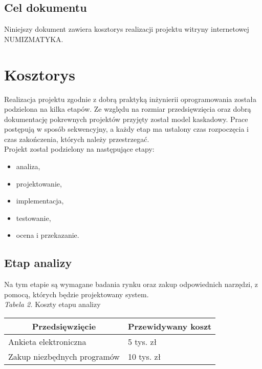 \documentclass 	[11pt, a4paper, leqno]	{article}					%
\begin{document}
\subsection{Cel dokumentu}
\noindent
Niniejszy dokument zawiera kosztorys realizacji projektu witryny internetowej NUMIZMATYKA. \\

\section{Kosztorys}
\noindent
Realizacja projektu zgodnie z dobrą praktyką inżynierii oprogramowania została podzielona na kilka etapów. Ze względu na rozmiar przedsięwzięcia oraz dobrą dokumentację pokrewnych projektów przyjęty został model kaskadowy. Prace postępują w sposób sekwencyjny, a każdy etap ma ustalony czas rozpoczęcia i czas zakończenia, których należy przestrzegać. \\

Projekt został podzielony na następujące etapy:
\begin{itemize}
\item analiza,
\item projektowanie,
\item implementacja,
\item testowanie,
\item ocena i przekazanie.
\end{itemize}


\subsection{Etap analizy}
\noindent
Na tym etapie są wymagane badania rynku oraz zakup odpowiednich narzędzi, z pomocą, których będzie projektowany system. \\ 

\textit{Tabela 2.} Koszty etapu analizy
\begin{center}
	\begin{tabular}{| l | l |}
		\hline
		\multicolumn{1}{|c|}{Przedsięwzięcie} & 
		\multicolumn{1}{|c|}{Przewidywany koszt} \\ \hline \hline
		Ankieta elektroniczna & 5 tys. zł \\ \hline
		Zakup niezbędnych programów & 10 tys. zł \\ \hline
	\end{tabular}
\end{center}
\end{document}
